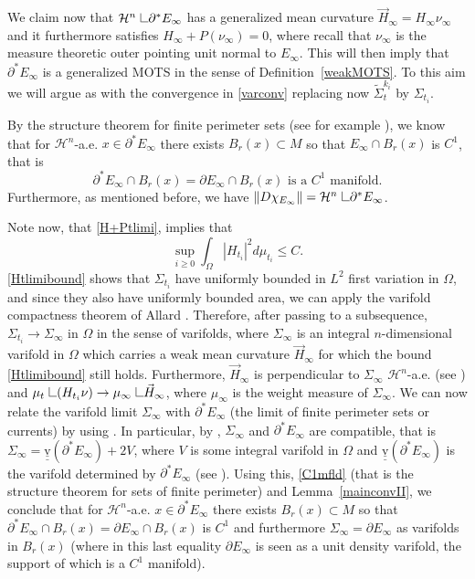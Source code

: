 \documentclass[11pt]{amsart}
\def\H{\mathcal{H}}
\def\var{\underline{\underline{\text{v}}}}
\def\wt{\widetilde}
\def\res{\hbox{ {\vrule height .25cm}{\leaders\hrule\hskip.2cm}}\hskip5.0\mu}
\begin{document}
We claim now that $\H^n\res \partial^*E_\infty$ has a generalized  mean curvature $\vec H_\infty=H_\infty\nu_\infty$ and it furthermore  satisfies $H_\infty+P(\nu_\infty)=0$, where recall that $\nu_\infty$ is the measure theoretic outer pointing unit normal to $E_\infty$.
This will then imply that $\partial^*E_\infty$ is a generalized MOTS in the sense of Definition~\ref{weakMOTS}.
To this aim we will argue as with the convergence in \eqref{varconv} replacing now $\wt \Sigma^{k_i}_t$ by $\Sigma_{t_i}$. 

By the structure theorem for  finite perimeter sets (see for example \cite[Section 5.7]{EG92}), we know that for $\H^{n}$-a.e. $x\in\partial^*E_\infty$ there exists $B_r(x)\subset M$ so that $E_\infty\cap B_r(x)$ is $C^1$, that is 
\begin{equation}\label{C1mfld}
\partial^* E_\infty\cap B_r(x)=\partial E_\infty\cap B_r(x)\text{   is a   }C^1 \text{   manifold}.
\end{equation} 
Furthermore, as mentioned before, we have  $\|D\chi_{E_\infty}\|=\H^{n}\res\partial^* E_\infty$.


Note now, that \eqref{H+Ptlimi}, implies that
\begin{equation}\label{Htlimibound}
\sup_{i\ge 0}\int_{\Omega}|H_{t_i}|^2d\mu_{t_i}\le C.
\end{equation}
\eqref{Htlimibound} shows that $\Sigma_{t_i}$
have  uniformly  bounded in $L^2$ first variation in $\Omega$, and since they also have  uniformly bounded area, we can apply the varifold compactness theorem of Allard \cite{Al}. Therefore,  after passing to a  subsequence,  $\Sigma_{t_i}\to \Sigma_\infty$ in $\Omega$ in the sense of varifolds, where $\Sigma_\infty$ is an integral $n$-dimensional varifold in $\Omega$ which carries a weak mean curvature $\vec H_\infty$ for which the bound \eqref{Htlimibound} still holds. Furthermore, $\vec H_\infty$ is perpendicular to $\Sigma_\infty$ $\H^{n}$-a.e. (see \cite[Chapter 5]{B}) and $\mu_t\res(H_{t_i} \nu)\to \mu_\infty\res\vec H_\infty$, where $\mu_\infty$ is the weight measure of $\Sigma_\infty$. We can now relate the varifold limit $\Sigma_\infty$ with $\partial^*E_\infty$ (the limit of finite perimeter sets or currents) by using \cite{W08}. In particular, by \cite[Theorem 1.2]{W08}, $\Sigma_\infty$ and $\partial^*E_\infty$ are compatible, that is $\Sigma_\infty=\var(\partial^* E_\infty)+ 2V$, where $V$ is some integral varifold in $\Omega$ and $\var(\partial^* E_\infty)$ is the varifold determined by $\partial^*E_\infty$ (see \cite[\S27]{LSgmt}). Using this, \eqref{C1mfld} (that is the structure theorem for sets of finite perimeter) and Lemma~\ref{mainconvII},  we conclude that for $\H^{n}$-a.e. $x\in\partial^*E_\infty$ there exists $B_r(x)\subset M$ so that $\partial^*E_\infty\cap B_r(x)=\partial E_\infty\cap B_r(x)$ is $C^1$ and furthermore $\Sigma_\infty=\partial E_\infty$ as varifolds in $B_r(x)$ (where in this last equality $\partial E_\infty$ is seen as a unit density varifold, the support of which  is a $C^1$ manifold). 
\end{document}
